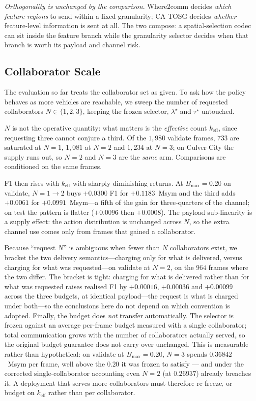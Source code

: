 \documentclass[journal]{IEEEtran}
\newcommand{\method}{CA-TOSG}
\begin{document}
\emph{Orthogonality is unchanged by the comparison.} Where2comm decides \emph{which feature regions}
to send within a fixed granularity; \method{} decides \emph{whether} feature-level information is
sent at all. The two compose: a spatial-selection codec can sit inside the feature branch while the
granularity selector decides when that branch is worth its payload and channel risk.

\subsection{Collaborator Scale}\label{sec:collab_scale}

The evaluation so far treats the collaborator set as given. To ask how the policy behaves as more
vehicles are reachable, we sweep the number of requested collaborators $N\in\{1,2,3\}$, keeping the
frozen selector, $\lambda^\star$ and $\tau^\star$ untouched.

$N$ is not the operative quantity: what matters is the \emph{effective} count $k_{\mathrm{eff}}$, since requesting three cannot conjure a third. Of the $1{,}980$ validate frames, $733$ are saturated at $N=1$, $1{,}081$ at $N=2$ and $1{,}234$ at $N=3$; on Culver-City the supply runs out, so $N=2$ and $N=3$ are the \emph{same} arm. Comparisons are conditioned on the same frames.

F1 then rises with $k_{\mathrm{eff}}$ with sharply diminishing returns. At $B_{\max}=0.20$ on validate, $N=1\!\to\!2$ buys $+0.0300$ F1 for $+0.1183$~Msym and the third adds $+0.0061$ for $+0.0991$~Msym---a fifth of the gain for three-quarters of the channel; on test the pattern is flatter ($+0.0096$ then $+0.0008$). The payload sub-linearity is a supply effect: the action distribution is unchanged across $N$, so the extra channel use comes only from frames that gained a collaborator.

Because ``request $N$'' is ambiguous when fewer than $N$ collaborators exist, we bracket the two
delivery semantics---charging only for what is delivered, versus charging for what was requested---on
validate at $N=2$, on the $964$ frames where the two differ. The bracket is tight: charging for
what is delivered rather than for what was requested raises realised F1 by $+0.00016$, $+0.00036$
and $+0.00099$ across the three budgets, at identical payload---the request is what is charged under
both---so the conclusions here do not depend on which convention is adopted. Finally, the budget does \emph{not} transfer automatically. The selector is frozen against an average per-frame budget measured with a single collaborator; total communication grows with the number of collaborators actually served, so the original budget guarantee does not carry over unchanged. This is measurable rather than hypothetical: on validate at $B_{\max}=0.20$, $N=3$ spends $0.36842$~Msym per frame, well above the $0.20$ it was frozen to satisfy --- and under the corrected single-collaborator accounting even $N=2$ (at $0.26937$) already breaches it. A deployment that serves more collaborators must therefore re-freeze, or budget on $k_{\mathrm{eff}}$ rather than per collaborator.
\end{document}
